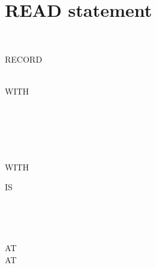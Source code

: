 

\section{READ statement}

 \filename
\begin{0-1}
   \\
\end{0-1}
RECORD
\begin{0-1}
   \identifier
\end{0-1}

\begin{0-1}
    \\

  WITH
  \begin{1=}
     \\
     \\
     \\
  \end{1=}
   \\

  WITH 
\end{0-1}

\begin{0-1}
   IS \identifier
\end{0-1}

\begin{0-1}
  \begin{1+}
      \imperativestatement \\
       \imperativestatement
  \end{1+} \\

  \begin{1+}
    AT  \imperativestatement \\
     AT  \imperativestatement
  \end{1+}
\end{0-1}

\begin{0-1}
\end{0-1}

